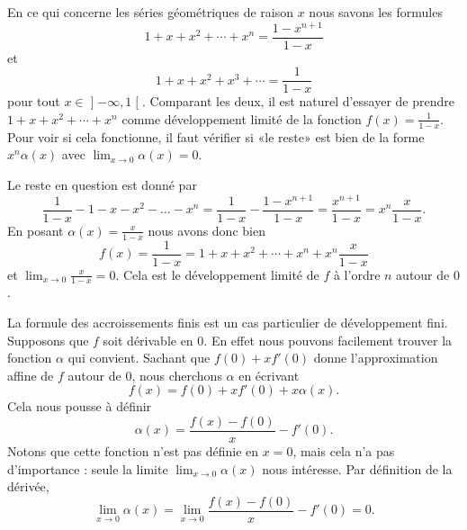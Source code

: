 \begin{example} \label{ExTHGooCBcnAy}
	En ce qui concerne les séries géométriques de raison \( x\) nous savons les formules
	\begin{equation}
		1+x+x^2+\cdots +x^n=\frac{ 1-x^{n+1} }{ 1-x }
	\end{equation}
	et
	\begin{equation}
		1+x+x^2+x^3+\cdots=\frac{ 1 }{ 1-x }
	\end{equation}
	pour tout \( x\in\mathopen] -\infty , 1 \mathclose[\). Comparant les deux, il est naturel d'essayer de prendre \( 1+x+x^2+\cdots +x^n\) comme développement limité de la fonction \( f(x)=\frac{1}{ 1-x }\). Pour voir si cela fonctionne, il faut vérifier si «le reste» est bien de la forme \( x^n\alpha(x)\) avec \( \lim_{x\to 0} \alpha(x)=0\).

	Le reste en question est donné par
	\begin{equation}
		\frac{1}{ 1-x }-1-x-x^2-\ldots-x^n=\frac{1}{ 1-x }-\frac{ 1-x^{n+1} }{ 1-x }=\frac{ x^{n+1} }{ 1-x }=x^n\frac{ x }{ 1-x }.
	\end{equation}
	En posant \( \alpha(x)=\frac{ x }{ 1-x }\) nous avons donc bien
	\begin{equation}
		f(x)=\frac{1}{ 1-x }=1+x+x^2+\cdots +x^n+x^n\frac{ x }{ 1-x }
	\end{equation}
	et \( \lim_{x\to 0} \frac{ x }{ 1-x }=0\). Cela est le développement limité de \( f\) à l'ordre \( n\) autour de \( 0\).
\end{example}

La formule des accroissements finis est un cas particulier de développement fini. Supposons que \( f\) soit dérivable en \( 0\). En effet nous pouvons facilement trouver la fonction \( \alpha\) qui convient. Sachant que \( f(0)+xf'(0)\) donne l'approximation affine de \( f\) autour de \( 0\), nous cherchons \( \alpha\) en écrivant
\begin{equation}
	f(x)=f(0)+xf'(0)+x\alpha(x).
\end{equation}
Cela nous pousse à définir
\begin{equation}    \label{EqDCFooKozKrt}
	\alpha(x)=\frac{ f(x)-f(0) }{ x }-f'(0).
\end{equation}
Notons que cette fonction n'est pas définie en \( x=0\), mais cela n'a pas d'importance : seule la limite \( \lim_{x\to 0} \alpha(x)\) nous intéresse. Par définition de la dérivée,
\begin{equation}
	\lim_{x\to 0} \alpha(x)=\lim_{x\to 0} \frac{ f(x)-f(0) }{ x }-f'(0)=0.
\end{equation}

